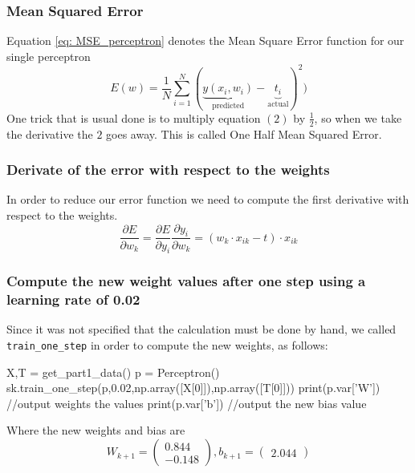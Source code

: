 \documentclass[11pt]{article}
\begin{document}
\subsubsection{Mean Squared Error}
Equation \ref{eq: MSE_perceptron} denotes the Mean Square Error function for our single perceptron
\begin{equation}
\label{eq: MSE_perceptron}
	E(w) = \frac{1}{N}\sum_{i = 1}^N(\underbrace{y(x_i,w_i)}_{\text{predicted}} - \underbrace{t_i}_{\text{actual}})^2)
\end{equation}
One trick that is usual done is to multiply equation $(2)$ by $\frac{1}{2}$, so when we take the derivative the $2$ goes away. This is called One Half Mean Squared Error.

\subsubsection{Derivate of the error with respect to the weights}
In order to reduce our error function we need to compute the first derivative with respect to the weights.\begin{equation}
\frac{\partial E}{\partial w_k}	=\frac{\partial E}{\partial y_i}\frac{\partial y_i}{\partial w_k} =  (w_k \cdot x_{ik} - t) \cdot x_{ik}
\end{equation}
\subsubsection{Compute the new weight values after one step using a learning rate of 0.02}
Since it was not specified that the calculation must be done by hand, we called \texttt{train\_one\_step} in order to compute the new weights, as follows:
\begin{python}
X,T = get_part1_data()
p = Perceptron()
sk.train_one_step(p,0.02,np.array([X[0]]),np.array([T[0]]))
print(p.var['W']) //output weights the values	
print(p.var['b']) //output the new bias value
\end{python}
Where the new weights and bias are
$$W_{k + 1} = \begin{pmatrix}
 0.844 \\
 -0.148
\end{pmatrix}, b_{k+1} = \begin{pmatrix}
	2.044
\end{pmatrix}$$
\end{document}
